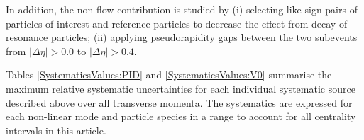 \documentclass[ALICE,manyauthors]{cernphprep}
\begin{document}
In addition, the non-flow contribution is studied by (i) selecting like sign pairs of particles of interest and reference particles to decrease the effect from decay of resonance particles; (ii) applying pseudorapidity gaps between the two subevents from $|\Delta\eta|>0.0$ to $|\Delta\eta|>0.4$.


Tables \ref{SystematicsValues:PID} and \ref{SystematicsValues:V0} summarise the maximum relative systematic uncertainties for each individual systematic source described above over all transverse momenta. The systematics are expressed for each non-linear mode and particle species in a range to account for all centrality intervals in this article. 



\end{document}
